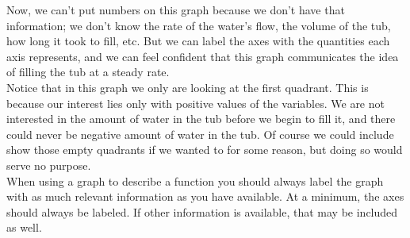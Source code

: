 Now, we can’t put numbers on this graph because we don’t have that information; we don’t know the rate of the water’s flow, the volume of the tub, how long it took to fill, etc. But we can label the axes with the quantities each axis represents, and we can feel confident that this graph communicates the idea of filling the tub at a steady rate.\\

Notice that in this graph we only are looking at the first quadrant. This is because our interest lies only with positive values of the variables. We are not interested in the amount of water in the tub before we begin to fill it, and there could never be negative amount of water in the tub. Of course we could include show those empty quadrants if we wanted to for some reason, but doing so would serve no purpose.\\

When using a graph to describe a function you should always label the graph with as much relevant information as you have available. At a minimum, the axes should always be labeled. If other information is available, that may be included as well.


